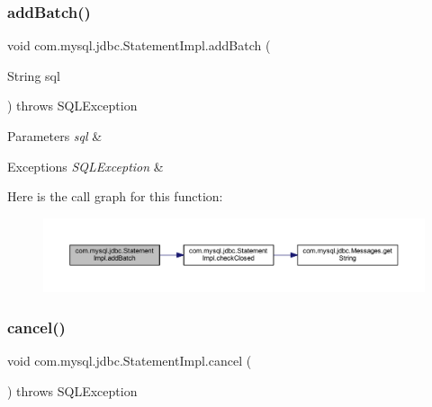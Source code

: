 \subsubsection{\texorpdfstring{add\+Batch()}{addBatch()}}
{\footnotesize\ttfamily void com.\+mysql.\+jdbc.\+Statement\+Impl.\+add\+Batch (\begin{DoxyParamCaption}\item[{String}]{sql }\end{DoxyParamCaption}) throws S\+Q\+L\+Exception}


\begin{DoxyParams}{Parameters}
{\em sql} & \\
\hline
\end{DoxyParams}

\begin{DoxyExceptions}{Exceptions}
{\em S\+Q\+L\+Exception} & \\
\hline
\end{DoxyExceptions}
Here is the call graph for this function\+:
\nopagebreak
\begin{figure}[H]
\begin{center}
\leavevmode
\includegraphics[width=350pt]{classcom_1_1mysql_1_1jdbc_1_1_statement_impl_a3ea3c4f24a3d1c9d4f9f9a9d29e53a02_cgraph}
\end{center}
\end{figure}
\mbox{\label{classcom_1_1mysql_1_1jdbc_1_1_statement_impl_acbb72ce19a291352b21e798031bef18d}} 
\subsubsection{\texorpdfstring{cancel()}{cancel()}}
{\footnotesize\ttfamily void com.\+mysql.\+jdbc.\+Statement\+Impl.\+cancel (\begin{DoxyParamCaption}{ }\end{DoxyParamCaption}) throws S\+Q\+L\+Exception}

